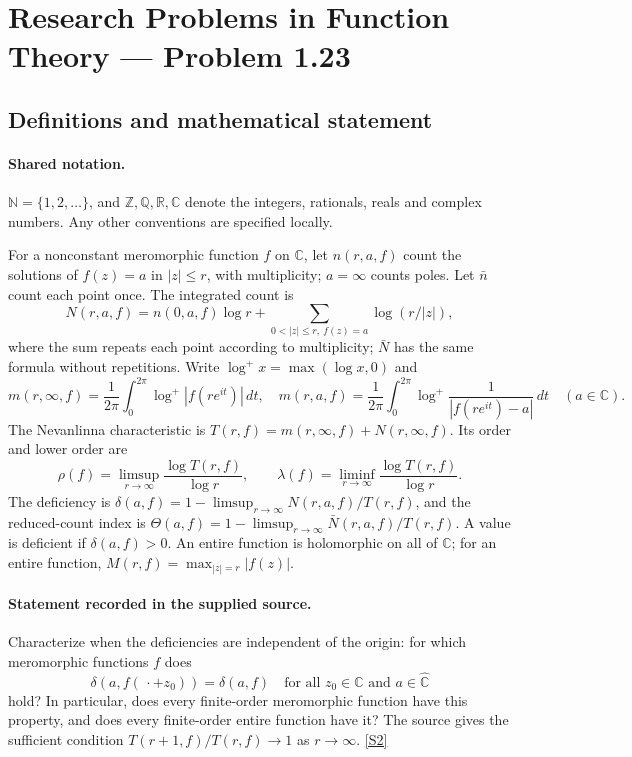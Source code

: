 \documentclass[11pt]{article}
\newcommand{\sref}[2]{\hyperlink{source:#1:#2}{[S#2]}}
\begin{document}
\section{Research Problems in Function Theory — Problem 1.23}\label{statement}

\subsection{Definitions and mathematical statement}

\paragraph{Shared notation.}$\mathbb N=\{1,2,\ldots\}$, and $\mathbb Z,\mathbb Q,\mathbb R,\mathbb C$ denote the integers, rationals, reals and complex numbers. Any other conventions are specified locally.


For a nonconstant meromorphic function $f$ on $\mathbb C$, let $n(r,a,f)$ count the solutions of $f(z)=a$ in $|z|\le r$, with multiplicity; $a=\infty$ counts poles. Let $\bar n$ count each point once. The integrated count is
\[
 N(r,a,f)=n(0,a,f)\log r+\sum_{0<|z|\le r,\ f(z)=a}\log(r/|z|),
\]
where the sum repeats each point according to multiplicity; $\bar N$ has the same formula without repetitions. Write $\log^+x=\max(\log x,0)$ and
\[
 m(r,\infty,f)=\frac1{2\pi}\int_0^{2\pi}\log^+|f(re^{it})|\,dt,\quad
 m(r,a,f)=\frac1{2\pi}\int_0^{2\pi}\log^+\frac1{|f(re^{it})-a|}\,dt\quad(a\in\mathbb C).
\]
The Nevanlinna characteristic is $T(r,f)=m(r,\infty,f)+N(r,\infty,f)$. Its order and lower order are
\[
 \rho(f)=\limsup_{r\to\infty}\frac{\log T(r,f)}{\log r},\qquad
 \lambda(f)=\liminf_{r\to\infty}\frac{\log T(r,f)}{\log r}.
\]
The deficiency is $\delta(a,f)=1-\limsup_{r\to\infty}N(r,a,f)/T(r,f)$, and the reduced-count index is $\Theta(a,f)=1-\limsup_{r\to\infty}\bar N(r,a,f)/T(r,f)$. A value is deficient if $\delta(a,f)>0$. An entire function is holomorphic on all of $\mathbb C$; for an entire function, $M(r,f)=\max_{|z|=r}|f(z)|$.
\paragraph{Statement recorded in the supplied source.}
Characterize when the deficiencies are independent of the origin: for which meromorphic functions $f$ does
\[
 \delta(a,f(\,\cdot+z_0))=\delta(a,f)
 \quad\text{for all }z_0\in\mathbb C\text{ and }a\in\widehat{\mathbb C}
\]
hold? In particular, does every finite-order meromorphic function have this property, and does every finite-order entire function have it? The source gives the sufficient condition $T(r+1,f)/T(r,f)\to1$ as $r\to\infty$. \sref{statement}{2}
\end{document}
